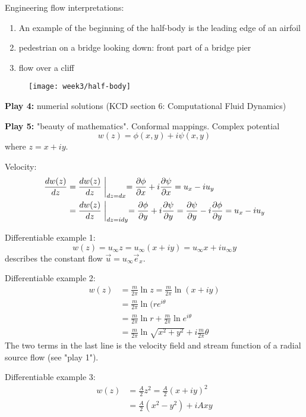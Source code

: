 Engineering flow interpretations:
\begin{enumerate}
\item An example of the beginning of the half-body is the leading edge of an airfoil
\item pedestrian on a bridge looking down: front part of a bridge pier
\item flow over a cliff
\end{enumerate}

\begin{figure}[!h]
    \centering
    \texttt{[image: week3/half-body]}\\
    \caption{}
    \label{fig:half-body}
\end{figure}

\textbf{Play 4:} numerial solutions (KCD section 6: Computational Fluid Dynamics)

\textbf{Play 5:} "beauty of mathematics". Conformal mappings.
Complex potential
\begin{equation}
w(z) = \phi(x,y)+i\psi(x,y)
\end{equation}
where $z=x+iy$.

Velocity:
\begin{align}
\frac{d w(z)}{d z} &= \frac{d w(z)}{d z}\biggm\vert_{dz=dx} = \frac{\partial \phi}{\partial x}+i\frac{\partial \psi}{\partial x} = u_x-iu_y \\
&= \frac{d w(z)}{d z}\biggm\vert_{dz=idy} = \frac{\partial \phi}{\partial y}+i\frac{\partial \psi}{\partial y} = \frac{\partial \psi}{\partial y}-i\frac{\partial \phi}{\partial y} = u_x-iu_y
\end{align}

Differentiable example 1:
\begin{equation}
w(z)=u_\infty z = u_\infty(x+iy) = u_\infty x + iu_\infty y
\end{equation}
describes the constant flow $\vec{u}=u_\infty \vec{e}_x$.

Differentiable example 2:
\begin{align}
w(z) &= \frac{m}{2\pi}\ln z = \frac{m}{2\pi} \ln(x+iy)\\
&= \frac{m}{2\pi}\ln(re^{i\theta}\\
&= \frac{m}{2\pi}\ln r +\frac{m}{2\pi}\ln e^{i\theta}\\
&= \frac{m}{2\pi}\ln\sqrt{x^2+y^2} + i\frac{m}{2\pi}\theta
\end{align}
The two terms in the last line is the velocity field and stream function of a radial source flow (see "play 1").

Differentiable example 3:
\begin{align}
w(z) &= \frac{A}{2}z^2 = \frac{A}{2}(x+iy)^2\\
&= \frac{A}{2}(x^2-y^2)+iAxy
\end{align}

